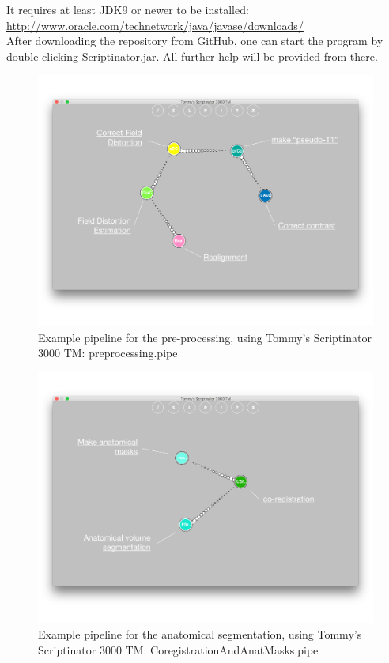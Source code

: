 \documentclass[12pt,a4paper]{scrartcl}
\begin{document}
\noindent It requires at least JDK9 or newer to be installed:\\

\href{http://www.oracle.com/technetwork/java/javase/downloads/}{http://www.oracle.com/technetwork/java/javase/downloads/}\\

\noindent After downloading the repository from GitHub, one can start the program by double clicking Scriptinator.jar. All further help will be provided from there.


\begin{figure}[h]
\begin{center}
\includegraphics[width=\textwidth]{preproc-pipe}
\caption[Pre-processing Pipeline]{Example pipeline for the pre-processing, using Tommy's Scriptinator 3000 TM: preprocessing.pipe}
\end{center}
\end{figure}

\begin{figure}[h]
\begin{center}
\includegraphics[width=\textwidth]{segment-pipe}
\caption[Segmentation Pipeline]{Example pipeline for the anatomical segmentation, using Tommy's Scriptinator 3000 TM: CoregistrationAndAnatMasks.pipe}
\end{center}
\end{figure}
\end{document}
